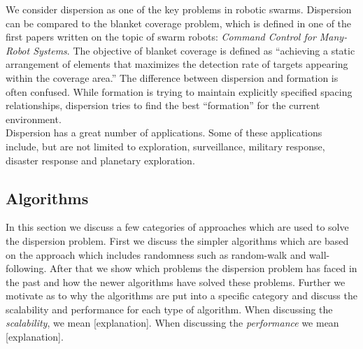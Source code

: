 
We consider dispersion as one of the key problems in robotic swarms. \cite{ugur2007dispersion,mclurkin2007distributed,ludwig2006robotic} 
Dispersion can be compared to the blanket coverage problem, which is defined in one of the first papers written on the topic of swarm robots: \emph{Command Control for Many-Robot Systems}. \cite{gage1992command} 
The objective of blanket coverage is defined as ``achieving a static arrangement of elements that maximizes the detection rate of targets appearing within the coverage area.'' \cite{gage1992command} 
The difference between dispersion and formation is often confused. 
While formation is trying to maintain explicitly specified spacing relationships, dispersion tries to find the best ``formation'' for the current environment. \\
Dispersion has a great number of applications. 
Some of these applications include, but are not limited to exploration, surveillance, military response, disaster response and planetary exploration. \cite{ludwig2006robotic,Penders2011,mclurkin2007distributed} 

\subsection{Algorithms}
In this section we discuss a few categories of approaches which are used to solve the dispersion problem.
First we discuss the simpler algorithms which are based on the approach which includes randomness such as random-walk and wall-following.
After that we show which problems the dispersion problem has faced in the past and how the newer algorithms have solved these problems.
Further we motivate as to why the algorithms are put into a specific category and discuss the scalability and performance for each type of algorithm.
When discussing the \emph{scalability}, we mean [explanation]. When discussing the \emph{performance} we mean [explanation]. 

